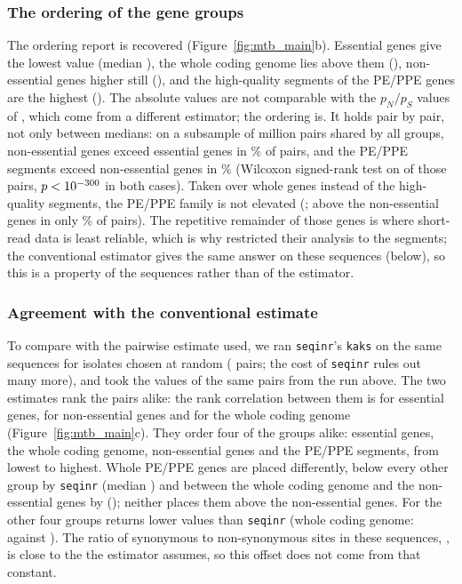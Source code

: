 \subsubsection*{The ordering of the gene groups}

The ordering \citet{gan2025} report is recovered (Figure~\ref{fig:mtb_main}b). Essential genes give
the lowest value (median \mtbMedianEssential{}), the whole coding genome lies above them
(\mtbMedianWhole{}), non-essential genes higher still (\mtbMedianNonessential{}), and the
high-quality segments of the PE/PPE genes are the highest (\mtbMedianPeppehq{}). The absolute values
are not comparable with the $p_N/p_S$ values of \citet{gan2025}, which come from a different
estimator; the ordering is. It holds pair by pair, not only between
medians: on a subsample of \mtbPairedPairsMillion{} million pairs shared by all groups, non-essential
genes exceed essential genes in \mtbShareNonessentialOverEssential\% of pairs, and the PE/PPE segments
exceed non-essential genes in \mtbSharePeppehqOverNonessential\% (Wilcoxon signed-rank test on
\mtbWilcoxonPairs{} of those pairs, $p < 10^{-300}$ in both cases). Taken over whole genes instead of the
high-quality segments, the PE/PPE family is not elevated (\mtbMedianPeppe{}; above the non-essential
genes in only \mtbSharePeppeOverNonessential\% of pairs). The repetitive remainder of those genes is
where short-read data is least reliable, which is why \citet{gan2025} restricted their analysis to
the segments; the conventional estimator gives the same answer on these sequences (below), so this is
a property of the sequences rather than of the estimator.

\subsubsection*{Agreement with the conventional estimate}

To compare \method with the pairwise estimate \citet{gan2025} used, we ran \texttt{seqinr}'s \texttt{kaks} on
the same sequences for \mtbSeqinrIsolates{} isolates chosen at random (\mtbSeqinrPairs{} pairs; the
cost of \texttt{seqinr} rules out many more), and took the \method values of the same pairs from the
run above. The two estimates rank the pairs alike: the rank correlation between them is
\mtbSpearmanSeqinrEssential{} for essential genes, \mtbSpearmanSeqinrNonessential{} for non-essential
genes and \mtbSpearmanSeqinrWhole{} for the whole coding genome (Figure~\ref{fig:mtb_main}c). They
order four of the groups alike: essential genes, the whole coding genome, non-essential genes and the
PE/PPE segments, from lowest to highest. Whole PE/PPE genes are placed differently, below every other
group by \texttt{seqinr} (median \mtbSeqinrMedianPeppe{}) and between the whole coding genome and the
non-essential genes by \method (\mtbToolMedianPeppe{}); neither places them above the non-essential
genes. For the other four groups \method returns lower values than \texttt{seqinr}
(whole coding genome: \mtbToolMedianWhole{} against \mtbSeqinrMedianWhole{}). The ratio of synonymous to
non-synonymous sites in these sequences, \mtbSiteRatioWhole{}, is close to the \mtbConstant{} the
estimator assumes, so this offset does not come from that constant.


